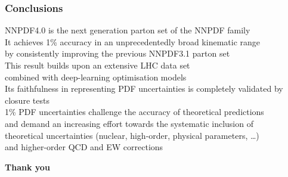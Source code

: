 \documentclass{beamer}
\begin{document}
\begin{frame}
 \frametitle{Conclusions}
 \footnotesize
 \centering
 NNPDF4.0 is the next generation parton set of the NNPDF family\\
 \vspace{0.3cm}
 It achieves 1\% accuracy in an unprecedentedly broad kinematic range\\
 by consistently improving the previous NNPDF3.1 parton set\\
 \vspace{0.3cm}
 This result builds upon an extensive LHC data set\\ 
 combined with deep-learning optimisation models\\
 \vspace{0.3cm}
 Its faithfulness in representing PDF uncertainties is completely validated by closure tests\\
 \vspace{0.3cm}
 1\% PDF uncertainties challenge the accuracy of theoretical predictions\\
 and demand an increasing effort towards the systematic inclusion of\\ 
 theoretical uncertainties (nuclear, high-order, physical parameters, \dots)\\
 and higher-order QCD and EW corrections\\
 \vspace{1cm}
 \begin{overlayarea}{\textwidth}{0.5cm}
  {
  }
  {
  \centering
  \Large\bf Thank you
  }
 \end{overlayarea}
\end{frame}
\end{document}
